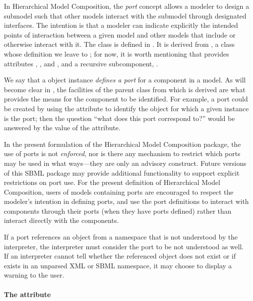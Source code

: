 In Hierarchical Model Composition, the \emph{port} concept allows a
modeler to design a submodel such that other models interact with the
submodel through designated interfaces.  The intention is that a modeler
can indicate explicitly the intended points of interaction between a
given model and other models that include or otherwise interact with it.
The \Port class is defined in .  It is derived
from \SBaseRef, a class whose definition we leave to
; for now, it is worth mentioning that \SBaseRef
provides attributes , ,  and
, and a recursive subcomponent, .

We say that a \Port object instance \emph{defines a port} for a
component in a model.  As will become clear in ,
the facilities of the \SBaseRef parent class from which \Port is derived
are what provides the means for the component to be identified.  For
example, a port could be created by using the 
attribute to identify the object for which a given \Port instance is the
port; then the question ``what does this port correspond to?'' would be
answered by the value of the  attribute.

In the present formulation of the Hierarchical Model Composition
package, the use of ports is not \emph{enforced}, nor is there any
mechanism to restrict which ports may be used in what ways---they are
only an advisory construct.  Future versions of this SBML package may
provide additional functionality to support explicit restrictions on
port use.  For the present definition of Hierarchical Model Composition,
users of models containing ports are encouraged to respect the modeler's
intention in defining ports, and use the port definitions to interact
with components through their ports (when they have ports defined)
rather than interact directly with the components.

If a port references an object from a namespace that is not understood
by the interpreter, the interpreter must consider the port to be not
understood as well.  If an interpreter cannot tell whether the
referenced object does not exist or if exists in an unparsed XML or SBML
namespace, it may choose to display a warning to the user.

\paragraph{The \fixttspace{} attribute}

